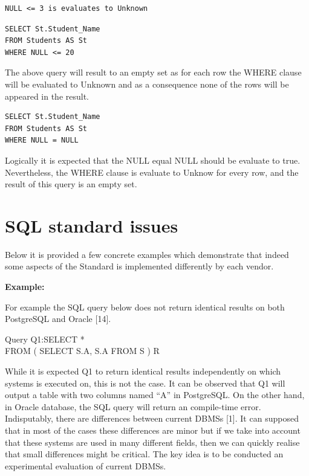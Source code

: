 \begin{mdframed}[nobreak=true, backgroundcolor=lightgray!20] 
\begin{lstlisting}[style=SQL]
NULL <= 3 is evaluates to Unknown 
\end{lstlisting}
\end{mdframed}

\hfill\newline 
\begin{mdframed}[nobreak=true, backgroundcolor=lightgray!20] 
\begin{lstlisting}[style=SQL]
SELECT St.Student_Name
FROM Students AS St 
WHERE NULL <= 20
\end{lstlisting}
\end{mdframed}

The above query will result to an empty set as for each row the WHERE clause will be evaluated to Unknown and as a consequence none of the rows will be appeared in the result. 

\hfill\newline
\begin{mdframed}[nobreak=true, backgroundcolor=lightgray!20] 
\begin{lstlisting}[style=SQL]
SELECT St.Student_Name
FROM Students AS St 
WHERE NULL = NULL
\end{lstlisting}
\end{mdframed}
Logically it is expected that the NULL equal NULL should be evaluate to true. Nevertheless, the WHERE clause is evaluate to Unknow for every row, and the result of this query is an empty set. 


\section{SQL standard issues} 

Below it is provided a few concrete examples which demonstrate that indeed some aspects of the Standard is implemented differently by each vendor. 
 
\noindent\textbf{Example:}

For example the SQL query below does not return identical results on both PostgreSQL and Oracle [14]. 


\begin{mdframed}[backgroundcolor=lightgray!20][h] 
Query Q1:SELECT * 
 \\FROM ( SELECT S.A, S.A FROM S ) R
\end{mdframed}

While it is expected Q1 to return identical results independently on which systems is executed on, this is not the case. It can be observed that Q1 will output a table with two columns named “A” in PostgreSQL. On the other hand, in Oracle database, the SQL query will return an compile-time error. Ιndisputably, there are differences between current DBMSs [1]. 
It can supposed that in most of the cases these differences are minor but if we take into account that these systems are used in many different fields, then we can quickly realise that small differences might be critical. The key idea is to be conducted an experimental evaluation of current DBMSs. 


